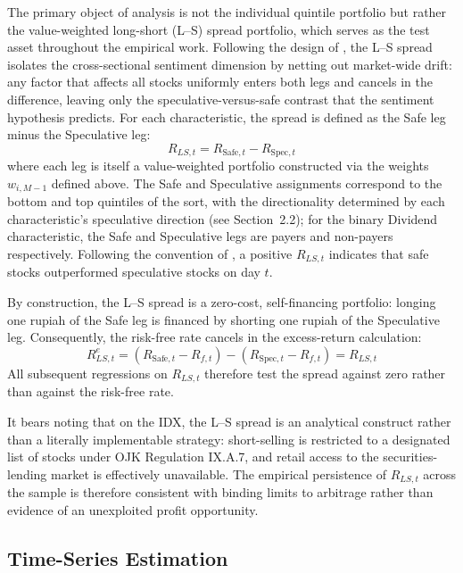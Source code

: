 \documentclass[
	a4paper,
	10pt,
	twoside,
]{LTJournalArticle}
\begin{document}
The primary object of analysis is not the individual quintile portfolio but rather the value-weighted long-short (L--S) spread portfolio, which serves as the test asset throughout the empirical work. Following the design of \citet{birru2018}, the L--S spread isolates the cross-sectional sentiment dimension by netting out market-wide drift: any factor that affects all stocks uniformly enters both legs and cancels in the difference, leaving only the speculative-versus-safe contrast that the sentiment hypothesis predicts. For each characteristic, the spread is defined as the Safe leg minus the Speculative leg:
\begin{equation}
    R_{LS, t} = R_{\text{Safe}, t} - R_{\text{Spec}, t}
\end{equation}
where each leg is itself a value-weighted portfolio constructed via the weights $w_{i, M-1}$ defined above. The Safe and Speculative assignments correspond to the bottom and top quintiles of the sort, with the directionality determined by each characteristic's speculative direction (see Section~2.2); for the binary Dividend characteristic, the Safe and Speculative legs are payers and non-payers respectively. Following the convention of \citet{birru2018}, a positive $R_{LS, t}$ indicates that safe stocks outperformed speculative stocks on day $t$.

By construction, the L--S spread is a zero-cost, self-financing portfolio: longing one rupiah of the Safe leg is financed by shorting one rupiah of the Speculative leg. Consequently, the risk-free rate cancels in the excess-return calculation:
\begin{equation}
    R^{e}_{LS, t} = (R_{\text{Safe}, t} - R_{f, t}) - (R_{\text{Spec}, t} - R_{f, t}) = R_{LS, t}
\end{equation}
All subsequent regressions on $R_{LS, t}$ therefore test the spread against zero rather than against the risk-free rate.

It bears noting that on the IDX, the L--S spread is an analytical construct rather than a literally implementable strategy: short-selling is restricted to a designated list of stocks under OJK Regulation IX.A.7, and retail access to the securities-lending market is effectively unavailable. The empirical persistence of $R_{LS, t}$ across the sample is therefore consistent with binding limits to arbitrage rather than evidence of an unexploited profit opportunity.


\subsection{Time-Series Estimation}
\end{document}
